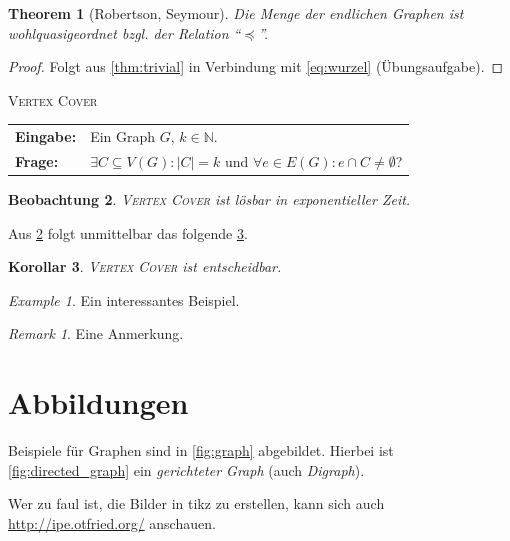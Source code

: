 \documentclass[a4paper,titlepage,twocolumn,oneside,12pt,ngerman,titlepage=firstiscover]{scrbook}
\makeatletter
\theoremstyle{plain} %
\newtheorem{theorem}{Theorem}[chapter]
\newtheorem{corollary}[theorem]{Korollar}
\newtheorem{observation}[theorem]{Beobachtung}
\theoremstyle{definition} %
\theoremstyle{remark} %
\newtheorem{example}{Example}
\newtheorem*{remark}{Remark}
\theoremstyle{plain}
\newcommand{\problemdef}[3]{
  \begin{center}
    \begin{minipage}{0.95\textwidth}
      \noindent
      \textsc{#1}
      
      \vspace{2pt}
      \setlength{\tabcolsep}{3pt}
      \begin{tabularx}{\textwidth}{@{}lX@{}}
        \textbf{Eingabe:} 		& #2 \\
        \textbf{Frage:} 	& #3
      \end{tabularx}
    \end{minipage}
  \end{center}
}
\newcommand{\NN}{\mathbb{N}} %
\newcommand\abs[1]{\left|#1\right|} %
\makeatother
\begin{document}
\begin{theorem}[Robertson, Seymour]
Die Menge der endlichen Graphen ist wohlquasigeordnet bzgl. der Relation \enquote{$\preceq$}.
\end{theorem}
\begin{proof}
Folgt aus \cref{thm:trivial} in Verbindung mit \cref{eq:wurzel} (Übungsaufgabe).
\end{proof}

\newcommand{\vertexcover}{\textsc{Vertex Cover}}
\problemdef{\vertexcover{}}
	{Ein Graph $G$, $k \in \NN$.}
	{$\exists C \subseteq V(G) : \abs{C} = k$ und $\forall e \in E(G): e \cap C \neq \emptyset$?}

\begin{observation}\label{thm:exponentialzeit}
\textsc{\vertexcover{}} ist lösbar in exponentieller Zeit.
\end{observation}

Aus \cref{thm:exponentialzeit} folgt unmittelbar das folgende \cref{thm:entscheidbar}.

\begin{corollary}\label{thm:entscheidbar}
\textsc{\vertexcover{}} ist entscheidbar.
\end{corollary}

\begin{example}
Ein interessantes Beispiel.
\end{example}

\begin{remark}
Eine Anmerkung.
\end{remark}


\section{Abbildungen}

Beispiele für Graphen sind in \cref{fig:graph} abgebildet.
Hierbei ist \cref{fig:directed_graph} ein \textit{gerichteter Graph} (auch \textit{Digraph}).

Wer zu faul ist, die Bilder in tikz zu erstellen, kann sich auch \url{http://ipe.otfried.org/} anschauen.
\end{document}
